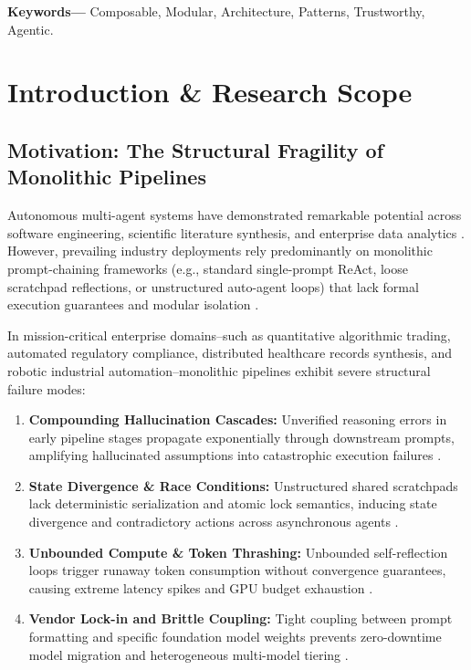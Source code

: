 \documentclass[10pt,journal,compsoc,twocolumn]{IEEEtran}
\begin{document}
\noindent\textbf{Keywords---} Composable, Modular, Architecture, Patterns, Trustworthy, Agentic.







\section{Introduction \& Research Scope}



\subsection{Motivation: The Structural Fragility of Monolithic Pipelines}


Autonomous multi-agent systems have demonstrated remarkable potential across software engineering, scientific literature synthesis, and enterprise data analytics \cite{arxiv_2005_14165,arxiv_2203_02155}. However, prevailing industry deployments rely predominantly on monolithic prompt-chaining frameworks (e.g., standard single-prompt ReAct, loose scratchpad reflections, or unstructured auto-agent loops) that lack formal execution guarantees and modular isolation \cite{arxiv_2312_03893}.

In mission-critical enterprise domains--such as quantitative algorithmic trading, automated regulatory compliance, distributed healthcare records synthesis, and robotic industrial automation--monolithic pipelines exhibit severe structural failure modes:
\begin{enumerate}
  \item \textbf{Compounding Hallucination Cascades:} Unverified reasoning errors in early pipeline stages propagate exponentially through downstream prompts, amplifying hallucinated assumptions into catastrophic execution failures \cite{arxiv_2406_00584}.
  \item \textbf{State Divergence \& Race Conditions:} Unstructured shared scratchpads lack deterministic serialization and atomic lock semantics, inducing state divergence and contradictory actions across asynchronous agents \cite{arxiv_2501_02497}.
  \item \textbf{Unbounded Compute \& Token Thrashing:} Unbounded self-reflection loops trigger runaway token consumption without convergence guarantees, causing extreme latency spikes and GPU budget exhaustion \cite{arxiv_2405_01543,arxiv_2406_04028}.
  \item \textbf{Vendor Lock-in and Brittle Coupling:} Tight coupling between prompt formatting and specific foundation model weights prevents zero-downtime model migration and heterogeneous multi-model tiering \cite{arxiv_2305_18290,arxiv_2208_14227}.
\end{enumerate}
\end{document}
